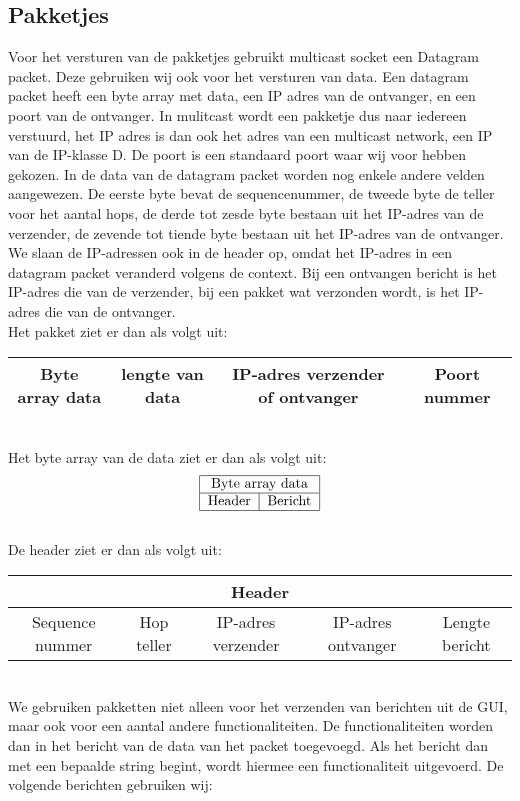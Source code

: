 \documentclass{article}
\begin{document}
\subsection{Pakketjes}
Voor het versturen van de pakketjes gebruikt multicast socket een Datagram packet. Deze gebruiken wij ook voor het versturen van data. Een datagram packet heeft een byte array met data, een IP adres van de ontvanger, en een poort van de ontvanger. In mulitcast wordt een pakketje dus naar iedereen verstuurd, het IP adres is dan ook het adres van een multicast network, een IP van de IP-klasse D. De poort is een standaard poort waar wij voor hebben gekozen. In de data van de datagram packet worden nog enkele andere velden aangewezen. De eerste byte bevat de sequencenummer, de tweede byte de teller voor het aantal hops, de derde tot zesde byte bestaan uit het IP-adres van de verzender, de zevende tot tiende byte bestaan uit het IP-adres van de ontvanger. We slaan de IP-adressen ook in de header op, omdat het IP-adres in een datagram packet veranderd volgens de context. Bij een ontvangen bericht is het IP-adres die van de verzender, bij een pakket wat verzonden wordt, is het IP-adres die van de ontvanger. \\


\noindent Het pakket ziet er dan als volgt uit:
\\
\begin{tabular}{|c|c|c|c|}
\hline
Byte array data & lengte van data & IP-adres verzender of ontvanger & Poort nummer \\
\hline
\end{tabular}
\\

\noindent Het byte array van de data ziet er dan als volgt uit:
\begin{align*}
\begin{tabular}[center]{| c | c |}
\hline
\multicolumn{2}{|c|}{Byte array data}  \\
\hline
Header & Bericht \\
\hline
\end{tabular}
\end{align*}
\\

De header ziet er dan als volgt uit:
\\
\begin{tabular}{| c | c | c | c | c |}
\hline
\multicolumn{5}{|c|}{Header}  \\
\hline
Sequence nummer & Hop teller & IP-adres verzender & IP-adres ontvanger & Lengte bericht \\
\hline
\end{tabular}
\phantom{YOLO}
\\
\noindent We gebruiken pakketten niet alleen voor het verzenden van berichten uit de GUI, maar ook voor een aantal andere functionaliteiten. De functionaliteiten worden dan in het bericht van de data van het packet toegevoegd. Als het bericht dan met een bepaalde string begint, wordt hiermee een functionaliteit uitgevoerd.
\newpage
De volgende berichten gebruiken wij:
\\
\end{document}
